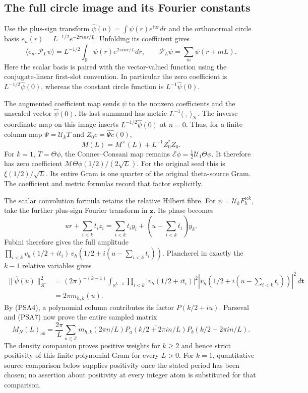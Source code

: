 \subsection{The full circle image and its Fourier constants}

Use the plus-sign transform
$\widehat\psi(u)=\int\psi(r)e^{iur}dr$ and the orthonormal circle
basis $e_n(r)=L^{-1/2}e^{-2\pi inr/L}$. Unfolding its coefficient gives
\[
 \langle e_n,\mathcal P_L\psi\rangle
 =L^{-1/2}\int_{\mathbb R}\psi(r)e^{2\pi inr/L}dr,
 \qquad \mathcal P_L\psi=\sum_m\psi(r+mL).
 \tag{PSA7}
\]
Here the scalar basis is paired with the vector-valued function using
the conjugate-linear first-slot convention. In particular the zero
coefficient is $L^{-1/2}\widehat\psi(0)$, whereas the constant circle
function is $L^{-1}\widehat\psi(0)$.

The augmented coefficient map sends $\psi$ to the nonzero coefficients
and the unscaled vector $\widehat\psi(0)$. Its last summand has metric
$L^{-1}\langle\ ,\ \rangle_{\mathcal K}$. The inverse coordinate map
on this image inserts $L^{-1/2}\widehat\psi(0)$ at $n=0$. Thus, for a
finite column map $\Psi=\mathcal U_kT$ and $Z_0c=\widehat{\Psi c}(0)$,
\[
 M(L)=M^\times(L)+L^{-1}Z_0^*Z_0.
 \tag{PSA8}
\]
For $k=1$, $T=\Theta\phi$, the Connes--Consani map remains
$\mathcal E\phi=\tfrac12\mathcal U_1\Theta\phi$. It therefore has
zero coefficient $\mathcal M\Theta\phi(1/2)/(2\sqrt L)$. For the
original seed this is $\xi(1/2)/\sqrt L$. Its entire Gram is one quarter
of the original theta-source Gram. The coefficient and metric formulas
record that factor explicitly.

The scalar convolution formula retains the relative Hilbert fibre.
For $\psi=\mathcal U_kF_h^{\otimes k}$, take the further plus-sign
Fourier transform in $\mathbf z$. Its phase becomes
\[
 ur+\sum_{i<k}t_i z_i
 =\sum_{i<k}t_i y_i+
       \left(u-\sum_{i<k}t_i\right)y_k.
 \tag{PSA9}
\]
Fubini therefore gives the full amplitude
$\prod_{i<k}v_h(1/2+it_i)\,
 v_h(1/2+i(u-\sum_{i<k}t_i))$.
Plancherel in exactly the $k-1$ relative variables gives
\[
 \begin{split}
 \|\widehat\psi(u)\|_{\mathcal K}^2
 &=(2\pi)^{-(k-1)}\int_{\mathbb R^{k-1}}
   \prod_{i<k}|v_h(1/2+it_i)|^2
   |v_h(1/2+i(u-\sum_{i<k}t_i))|^2\,d\mathbf t\\
 &=2\pi m_{h,k}(u).
 \end{split}
 \tag{PSA10}
\]
By (PSA4), a polynomial column contributes its factor
$P(k/2+iu)$. Parseval and (PSA7) now prove the entire sampled matrix
\[
 M_N(L)_{ab}=\frac{2\pi}{L}\sum_{n\in\mathbb Z}
 m_{h,k}(2\pi n/L)
 \overline{P_a(k/2+2\pi in/L)}P_b(k/2+2\pi in/L).
 \tag{PSA11}
\]
The density companion proves positive weights for $k\ge2$ and hence
strict positivity of this finite polynomial Gram for every $L>0$.
For $k=1$, quantitative source comparison below supplies positivity
once the stated period has been chosen; no assertion about positivity
at every integer atom is substituted for that comparison.

